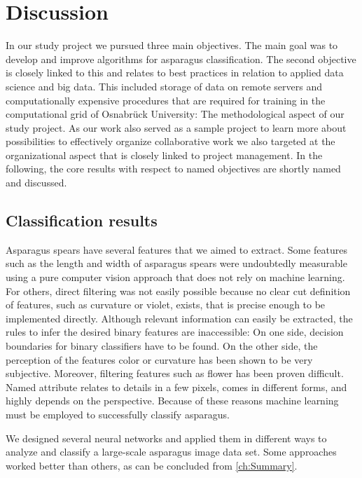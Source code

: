 \section{Discussion}
\label{ch:Discussion}

In our study project we pursued three main objectives. The main goal was to develop and improve algorithms for asparagus classification. The second objective is closely linked to this and relates to best practices in relation to applied data science and big data. This included storage of data on remote servers and computationally expensive procedures that are required for training in the computational grid of Osnabr{\"u}ck University: The methodological aspect of our study project. As our work also served as a sample project to learn more about possibilities to effectively organize collaborative work we also targeted at the organizational aspect that is closely linked to project management. In the following, the core results with respect to named objectives are shortly named and discussed.


\subsection{Classification results}
\label{sec:DiscussionResults}

Asparagus spears have several features that we aimed to extract. Some features such as the length and width of asparagus spears were undoubtedly measurable using a pure computer vision approach that does not rely on machine learning. For others, direct filtering was not easily possible because no clear cut definition of features, such as curvature or violet, exists, that is precise enough to be implemented directly. Although relevant information can easily be extracted, the rules to infer the desired binary features are inaccessible: On one side, decision boundaries for binary classifiers have to be found. On the other side, the perception of the features color or curvature has been shown to be very subjective. Moreover, filtering features such as flower has been proven difficult. Named attribute relates to details in a few pixels, comes in different forms, and highly depends on the perspective. Because of these reasons machine learning must be employed to successfully classify asparagus.

We designed several neural networks and applied them in different ways to analyze and classify a large-scale asparagus image data set. Some approaches worked better than others, as can be concluded from \autoref{ch:Summary}.

